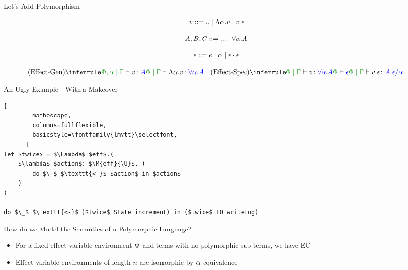 \documentclass{beamer}
\newcommand\script[1]{}
\begin{document}
\begin{frame}{Let's Add Polymorphism}
   
\begin{align*}
    v::=\text{..}\mid\elam{\a}{v}\mid\eapp{v}{\e}
\end{align*}

\begin{align*}
    A, B, C::=\text{...}\mid \all{\a}{A}
\end{align*}

\begin{align*}
    \e ::= e \mid \a \mid \e\dot\e
\end{align*}

    \[
        \ntreeruleI{Effect-Gen}{\etyperelation{\P,\a}{\G}{v}{A}}{\gpetyperelation{\elam{\a}{v}}{\all{\a}{A}}}
        \quad
        \ntreeruleII{Effect-Spec}{\gpetyperelation{v}{\all{\a}A}}{\wellformed{\P}{\e}}{\gpetyperelation{\eapp{v}{\e}}{A\ssub{\a}{\e}}}    
    \]
    \script{
        - Let's now add some polymorphism syntax to EC.
        - This gives us the polymorphic effect calculus.
        - Notice now that in our type rules, we now have an effect-variable environment. Important later
    }
\end{frame}

\begin{frame}[fragile]{An Ugly Example - With a Makeover}

    \begin{lstlisting}[
        mathescape,
        columns=fullflexible,
        basicstyle=\fontfamily{lmvtt}\selectfont,
      ]
let $twice$ = $\Lambda$ $eff$.(
    $\lambda$ $action$: $\M{eff}{\U}$. (
        do $\_$ $\texttt{<-}$ $action$ in $action$
    )
)

do $\_$ $\texttt{<-}$ ($twice$ State increment) in ($twice$ IO writeLog)
    \end{lstlisting}
    \script{
        - We've now added polymorphism, which makes our ugly program more concise.
        - We can reuse this function
    }
\end{frame}

\begin{frame}{How do we Model the Semantics of a Polymorphic Language?}

    \begin{itemize}
        \setlength\itemsep{3em}
        \item For a fixed effect variable environment $\P$ and terms with no polymorphic sub-terms, we have EC
        \item Effect-variable environments of length $n$ are isomorphic by $\a$-equivalence
    \end{itemize}
    
    

    \script{
        - If we fix the effect-variable environment, and disallow polymorphic terms, then PEC terms become EC terms for a particular instantiation.
        - We already know how to build models for PEC
        -It's also the case that effect-variable environments can type the same set of relations, upto alpha equivalence.
        - So there is a countable set of these EC instantiations
    }
\end{frame}
\end{document}
